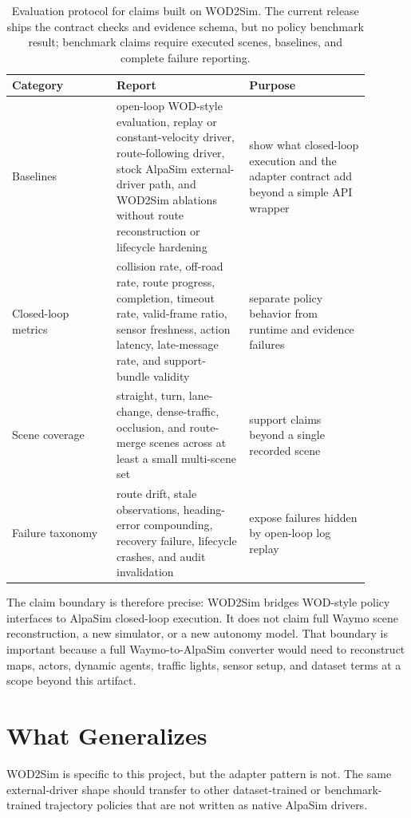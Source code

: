 \documentclass{article}
\begin{document}
\begin{table}[t]
\centering
\small
\begin{tabular}{p{0.26\linewidth}p{0.33\linewidth}p{0.30\linewidth}}
\toprule
Category & Report & Purpose \\
\midrule
Baselines & open-loop WOD-style evaluation, replay or constant-velocity driver,
route-following driver, stock AlpaSim external-driver path, and WOD2Sim ablations without
route reconstruction or lifecycle hardening & show what closed-loop execution and the
adapter contract add beyond a simple API wrapper \\
Closed-loop metrics & collision rate, off-road rate, route progress, completion,
timeout rate, valid-frame ratio, sensor freshness, action latency, late-message rate, and
support-bundle validity & separate policy behavior from runtime and evidence failures \\
Scene coverage & straight, turn, lane-change, dense-traffic, occlusion, and route-merge
scenes across at least a small multi-scene set & support claims beyond a single recorded
scene \\
Failure taxonomy & route drift, stale observations, heading-error compounding, recovery
failure, lifecycle crashes, and audit invalidation & expose failures hidden by open-loop
log replay \\
\bottomrule
\end{tabular}
\caption{Evaluation protocol for claims built on WOD2Sim. The current release ships the
contract checks and evidence schema, but no policy benchmark result; benchmark claims
require executed scenes, baselines, and complete failure reporting.}
\label{tab:eval_protocol}
\end{table}

The claim boundary is therefore precise: WOD2Sim bridges WOD-style policy
interfaces to AlpaSim closed-loop execution. It does not claim full Waymo scene
reconstruction, a new simulator, or a new autonomy model. That boundary is important
because a full Waymo-to-AlpaSim converter would need to reconstruct maps, actors, dynamic
agents, traffic lights, sensor setup, and dataset terms at a scope beyond this artifact.

\section{What Generalizes}

WOD2Sim is specific to this project, but the adapter pattern is not. The same
external-driver shape should transfer to other dataset-trained or benchmark-trained
trajectory policies that are not written as native AlpaSim drivers.
\end{document}
